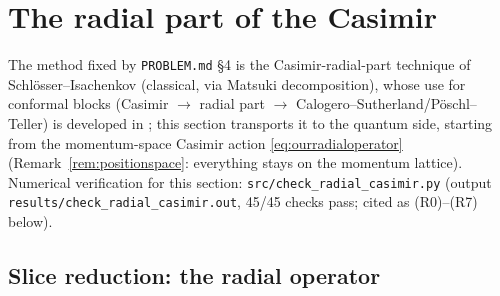 \documentclass[11pt,a4paper]{article}
\theoremstyle{definition}
\theoremstyle{plain}
\begin{document}
\section{The radial part of the Casimir}
\label{sec:radial}


The method fixed by \texttt{PROBLEM.md} \S4 is the Casimir-radial-part technique of
Schl\"osser--Isachenkov \cite{Schlosser:2024matsuki} (classical, via Matsuki decomposition),
whose use for conformal blocks (Casimir $\to$ radial part $\to$
Calogero--Sutherland/P\"oschl--Teller) is developed in
\cite{Isachenkov:2016superint,Isachenkov:2017integrability}; this section transports it to
the quantum side, starting from the momentum-space Casimir action
\eqref{eq:ourradialoperator} (Remark~\ref{rem:positionspace}: everything stays on the
momentum lattice). Numerical verification for this section:
\texttt{src/check\_radial\_casimir.py} (output
\texttt{results/check\_radial\_casimir.out}, 45/45 checks pass; cited as (R0)--(R7) below).

\subsection{Slice reduction: the radial operator}
\end{document}
